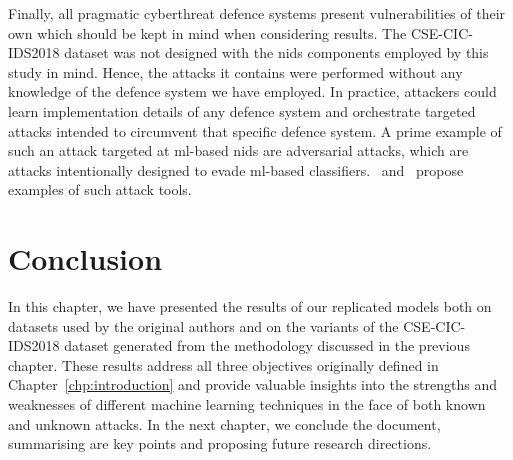 Finally, all pragmatic cyberthreat defence systems present vulnerabilities of
their own which should be kept in mind when considering results. The
CSE-CIC-IDS2018 dataset was not designed with the \gls{nids} components
employed by this study in mind. Hence, the attacks it contains were performed
without any knowledge of the defence system we have employed. In practice,
attackers could learn implementation details of any defence system and
orchestrate targeted attacks intended to circumvent that specific defence
system. A prime example of such an attack targeted at \gls{ml}-based \gls{nids}
are adversarial attacks, which are attacks intentionally designed to evade
\gls{ml}-based classifiers.~\cite{adversarial1} and~\cite{adversarial2} propose
examples of such attack tools.

\section{Conclusion}%
\label{sec:conclusion4}

In this chapter, we have presented the results of our replicated models both on
datasets used by the original authors and on the variants of the
CSE-CIC-IDS2018 dataset generated from the methodology discussed in the
previous chapter. These results address all three objectives originally defined
in Chapter~\ref{chp:introduction} and provide valuable insights into the
strengths and weaknesses of different machine learning techniques in the face
of both known and unknown attacks. In the next chapter, we conclude the
document, summarising are key points and proposing future research directions.